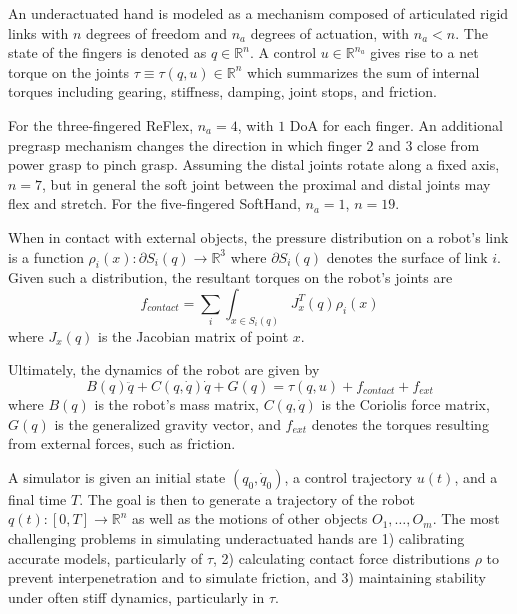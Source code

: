 An underactuated hand is modeled as a mechanism  composed of articulated rigid links with $n$ degrees of freedom and $n_a$ degrees of actuation, with $n_a < n$.  The state of the fingers is denoted as $q \in \mathbb{R}^n$.  A control $u \in \mathbb{R}^{n_a}$ gives rise to a net torque on the joints $\tau \equiv \tau(q,u) \in \mathbb{R}^n$ which summarizes the sum of internal torques including gearing, stiffness, damping, joint stops, and friction.

For the three-fingered ReFlex, $n_a=4$, with $1$ DoA for each finger. An additional pregrasp mechanism changes the direction in which finger $2$ and $3$ close from power grasp to pinch grasp. Assuming the distal joints rotate along a fixed axis, $n=7$, but in general the soft joint between the proximal and distal joints may flex and stretch.
For the five-fingered SoftHand, $n_a=1$, $n=19$.

When in contact with external objects, the pressure distribution on a robot's link is a function $\rho_i(x):\partial S_i(q) \rightarrow \mathbb{R}^3$ where $\partial S_i(q)$ denotes the surface of link $i$. Given such a distribution, the resultant torques on the robot's joints are 
\begin{equation}
f_{contact} = \sum_i \int_{x\in S_i(q)} J_{x}^T(q) \rho_i(x)
\end{equation} where $J_{x}(q)$ is the Jacobian matrix of point $x$.

Ultimately, the dynamics of the robot are given by
\begin{equation}
\label{eq:Dynamics}
B(q)\ddot{q} + C(q,\dot{q})\dot{q} + G(q) = \tau(q,u) + f_{contact} + f_{ext}
\end{equation}
where $B(q)$ is the robot's mass matrix, $C(q,\dot{q})$ is the Coriolis force matrix, $G(q)$ is the generalized gravity vector, and $f_{ext}$ denotes the torques resulting from external forces, such as friction.

A simulator is given an initial state $(q_0,\dot{q}_0)$, a control trajectory $u(t)$, and a final time $T$.  The goal is then to generate a trajectory of the robot $q(t):[0,T]\rightarrow \mathbb{R}^n$ as well as the motions of other objects $O_1,\ldots,O_m$. The most challenging problems in simulating underactuated hands are 1) calibrating accurate models, particularly of $\tau$, 2) calculating contact force distributions $\rho$ to prevent interpenetration and to simulate friction, and 3) maintaining stability under often stiff dynamics, particularly in $\tau$.

